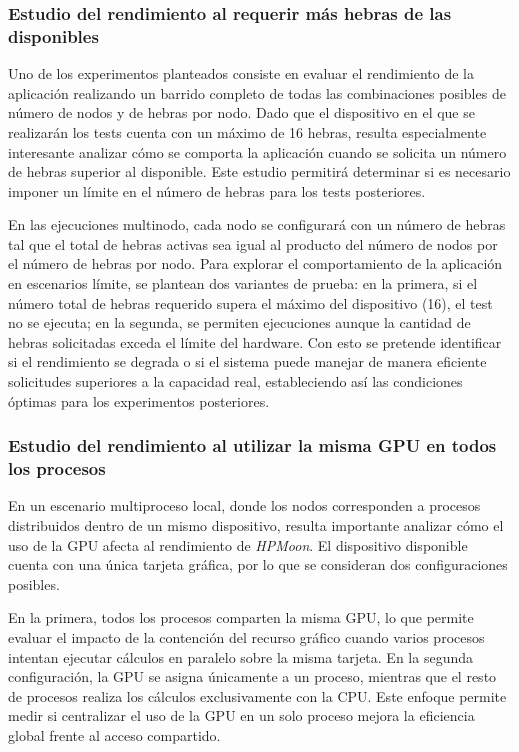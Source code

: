 \subsubsection{Estudio del rendimiento al requerir más hebras de las disponibles}

Uno de los experimentos planteados consiste en evaluar el rendimiento de la aplicación realizando un barrido completo de todas las combinaciones posibles de número de nodos y de hebras por nodo. Dado que el dispositivo en el que se realizarán los tests cuenta con un máximo de 16 hebras, resulta especialmente interesante analizar cómo se comporta la aplicación cuando se solicita un número de hebras superior al disponible. Este estudio permitirá determinar si es necesario imponer un límite en el número de hebras para los tests posteriores.

En las ejecuciones multinodo, cada nodo se configurará con un número de hebras tal que el total de hebras activas sea igual al producto del número de nodos por el número de hebras por nodo. Para explorar el comportamiento de la aplicación en escenarios límite, se plantean dos variantes de prueba: en la primera, si el número total de hebras requerido supera el máximo del dispositivo (16), el test no se ejecuta; en la segunda, se permiten ejecuciones aunque la cantidad de hebras solicitadas exceda el límite del hardware. Con esto se pretende identificar si el rendimiento se degrada o si el sistema puede manejar de manera eficiente solicitudes superiores a la capacidad real, estableciendo así las condiciones óptimas para los experimentos posteriores.

\subsubsection{Estudio del rendimiento al utilizar la misma GPU en todos los procesos}

En un escenario multiproceso local, donde los nodos corresponden a procesos distribuidos dentro de un mismo dispositivo, resulta importante analizar cómo el uso de la GPU afecta al rendimiento de \textit{HPMoon}. El dispositivo disponible cuenta con una única tarjeta gráfica, por lo que se consideran dos configuraciones posibles.

En la primera, todos los procesos comparten la misma GPU, lo que permite evaluar el impacto de la contención del recurso gráfico cuando varios procesos intentan ejecutar cálculos en paralelo sobre la misma tarjeta. En la segunda configuración, la GPU se asigna únicamente a un proceso, mientras que el resto de procesos realiza los cálculos exclusivamente con la CPU. Este enfoque permite medir si centralizar el uso de la GPU en un solo proceso mejora la eficiencia global frente al acceso compartido.

